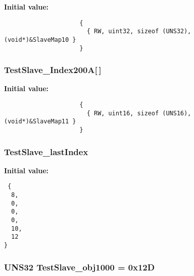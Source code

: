\textbf{Initial value:}

\begin{Code}\begin{verbatim} 
                     {
                       { RW, uint32, sizeof (UNS32), (void*)&SlaveMap10 }
                     }
\end{verbatim}\end{Code}
\subsubsection{ {\bf Test\-Slave\_\-Index200A}[$\,$]}\label{TestSlave_8c_7c04d8ddc70002a63f8edd0ceece965f}


\textbf{Initial value:}

\begin{Code}\begin{verbatim} 
                     {
                       { RW, uint16, sizeof (UNS16), (void*)&SlaveMap11 }
                     }
\end{verbatim}\end{Code}
\subsubsection{ {\bf Test\-Slave\_\-last\-Index}}\label{TestSlave_8c_5f1197612ee61ad7f8dbc29a0e7caa93}


\textbf{Initial value:}

\begin{Code}\begin{verbatim} {
  8, 
  0, 
  0, 
  0, 
  10, 
  12 
}
\end{verbatim}\end{Code}
\subsubsection{\setlength{\rightskip}{0pt plus 5cm}UNS32 {\bf Test\-Slave\_\-obj1000} = 0x12D}\label{TestSlave_8c_8a4ca2e7cbdf8b110f19184e1fe06738}


